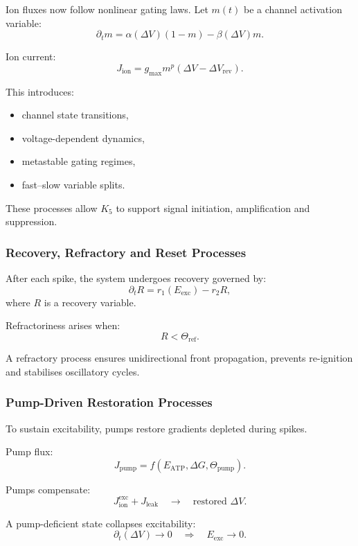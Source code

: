 Ion fluxes now follow nonlinear gating laws.  
Let $m(t)$ be a channel activation variable:
\[
\partial_t m = \alpha(\Delta V)(1-m) - \beta(\Delta V)m.
\]

Ion current:
\[
J_{\text{ion}} = g_{\text{max}} m^p (\Delta V - \Delta V_{\text{rev}}).
\]

This introduces:
\begin{itemize}
    \item channel state transitions,
    \item voltage-dependent dynamics,
    \item metastable gating regimes,
    \item fast–slow variable splits.
\end{itemize}

These processes allow $K_5$ to support signal initiation, 
amplification and suppression.

\subsubsection{Recovery, Refractory and Reset Processes}

After each spike, the system undergoes recovery governed by:
\[
\partial_t R = r_1(E_{\text{exc}}) - r_2 R,
\]
where $R$ is a recovery variable.

Refractoriness arises when:
\[
R < \Theta_{\text{ref}}.
\]

A refractory process ensures unidirectional front propagation, 
prevents re-ignition and stabilises oscillatory cycles.

\subsubsection{Pump-Driven Restoration Processes}

To sustain excitability, pumps restore gradients depleted during spikes.

Pump flux:
\[
J_{\text{pump}} = f(E_{\text{ATP}}, \Delta G, \Theta_{\text{pump}}).
\]

Pumps compensate:
\[
J_{\text{ion}}^{\text{exc}} + J_{\text{leak}}
\quad\longrightarrow\quad
\text{restored }\Delta V.
\]

A pump-deficient state collapses excitability:
\[
\partial_t (\Delta V) \to 0
\quad\Rightarrow\quad
E_{\text{exc}} \to 0.
\]

